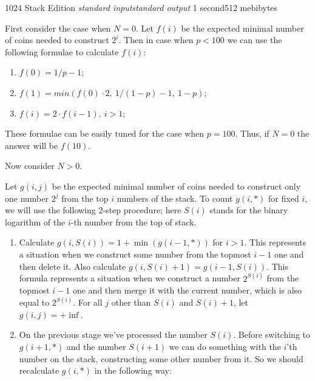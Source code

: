 \begin{problem}{1024 Stack Edition}
{\textsl{standard input}}{\textsl{standard output}}
{1 second}{512 mebibytes}{}

First consider the case when $N=0$. Let $f(i)$ be the expected minimal number
of coins needed to construct $2^i$. Then in case when $p<100$ we can 
use the following formulae to calculate $f(i)$:
\begin{enumerate}

\item $f(0) = 1 / p - 1$;

\item $f(1) = min (f(0) \cdot 2,~1 / (1 - p) - 1,~1 - p)$;

\item $f(i) = 2 \cdot f(i - 1),~i > 1$;

\end{enumerate}

These formulae can be easily tuned for the case when $p=100$. Thus, if $N = 0$ the answer will be $f(10)$.

Now consider $N > 0$. 

Let $g(i, j)$ be the expected minimal number of coins needed to
construct only one number $2^j$ from the top $i$ numbers of the stack. 
To count $g(i, *)$ for fixed $i$, we will use the following 2-step procedure;
here $S(i)$ stands for the binary logarithm of the $i$-th number from the top of stack.

\begin{enumerate}

\item Calculate $g(i, S(i)) = 1 + \min( g(i - 1, *) )$ for $i > 1$.
This represents a situation when we construct some number from
the topmost $i-1$ one and then delete it.
Also calculate $g(i, S(i) + 1) = g(i - 1, S(i))$.
This formula represents a situation when we construct a number $2^{S(i)}$
from the topmost $i-1$ one and then merge it
with the current number, which is also equal to $2^{S(i)}$.
For all $j$ other than $S(i)$ and $S(i) + 1$, let $g(i, j) = +\inf$.

\item On the previous stage we've processed the number $S(i)$.
Before switching
to $g(i + 1, *)$ and the number $S(i + 1)$ we can do something
with the $i$'th number on the stack, constructing some other number from it.
So we should recalculate $g(i, *)$ in the following way: 

\begin{itemize}


\end{itemize}
\end{enumerate}
\end{problem}
